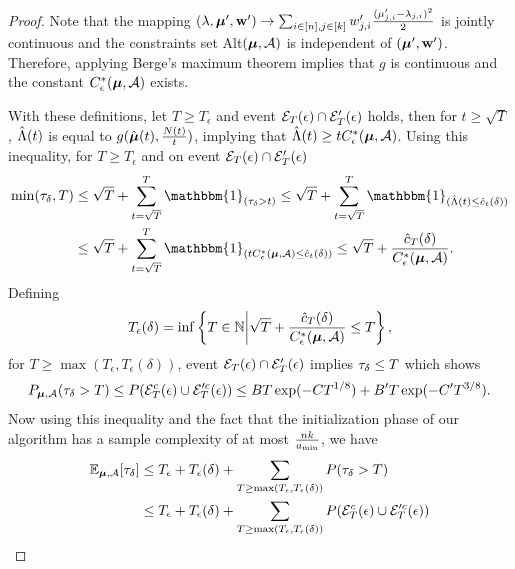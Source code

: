 \begin{proof}
        
        Note that the mapping $(\mathbf{\lambda}, \boldsymbol{\mu}', \mathbf{w}') \rightarrow \sum_{i \in [n], j \in [k]} w'_{j,i} \frac{(\mu'_{j,i} - \mathbf{\lambda}_{j,i})^2}{2}$ is jointly continuous and the constraints set Alt$(\boldsymbol{\mu}, \mathcal{A})$ is independent of $(\boldsymbol{\mu}', \mathbf{w}')$. Therefore, applying Berge's maximum theorem \cite{berge1963topological} implies that $g$ is continuous and the constant $C^*_{\epsilon}(\boldsymbol{\mu}, \mathcal{A})$ exists.
    
        With these definitions, let $T \geq T_{\epsilon}$ and event $\mathcal{E}_T(\epsilon) \cap \mathcal{E}'_T(\epsilon)$ holds, then for $t \geq \sqrt{T}$, $\hat{\Lambda}(t)$ is equal to $g(\hat{\boldsymbol{\mu}}(t), \frac{N(t)}{t})$, implying that $\hat{\Lambda}(t) \geq t C^*_{\epsilon}(\boldsymbol{\mu}, \mathcal{A})$. Using this inequality, for $T \geq T_{\epsilon}$ and on event $\mathcal{E}_T(\epsilon) \cap \mathcal{E}'_T(\epsilon)$
        \begin{align*}
            \min(\taudel, T) &\leq \sqrt{T} + \sum_{t = \sqrt{T}}^{T} \mathbbm{1}_{(\taudel > t)} \leq \sqrt{T} + \sum_{t = \sqrt{T}}^{T} \mathbbm{1}_{(\lamht \leq \cdelt)} \\
            & \leq \sqrt{T}  + \sum_{t = \sqrt{T}}^{T} \mathbbm{1}_{(t \cstareps \leq \cdelt)} \leq \sqrt{T} + \frac{\hat{c}_T(\delta)}{\cstareps}. 
        \end{align*}
        Defining
        \begin{align*}
            T_{\epsilon}(\delta) = \inf \left\{ T \in \mathbb{N} \bigg \vert \sqrt{T} + \frac{\hat{c}_T(\delta)}{C^*_{\epsilon}(\boldsymbol{\mu}, \mathcal{A})} \leq T \right\},
        \end{align*}
        for $T \geq \max(T_{\epsilon}, T_{\epsilon}(\delta))$, event $\mathcal{E}_T(\epsilon) \cap \mathcal{E}'_T(\epsilon)$ implies $\tau_{\delta} \leq T$ which shows 
        \begin{align*}
            P_{\boldsymbol{\mu}, \mathcal{A}}(\tau_{\delta} > T) \leq P(\mathcal{E}_T^c(\epsilon) \cup \mathcal{E}'^c_T(\epsilon)) \leq BT \exp(-C T^{1/8}) +  B'T \exp(-C'T^{3/8}).
        \end{align*}
        Now using this inequality and the fact that the initialization phase of our algorithm has a sample complexity of at most $\frac{nk}{a_{\min}}$, we have
        \begin{align}        
            \mathbb{E}_{\bmu, \A}[\taudel] &\leq T_{\epsilon} +  T_{\epsilon}(\delta) + \sum_{T \geq \max(T_{\epsilon}, T_{\epsilon}(\delta))} \pr (\taudel > T ) \nonumber \\  
                           &\leq T_{\epsilon} +  T_{\epsilon}(\delta) + \sum_{T \geq \max(T_{\epsilon}, T_{\epsilon}(\delta))} \pr(\E^c_T(\epsilon) \cup \E'^c_T(\epsilon)) \nonumber \\

\end{align}
\end{proof}
